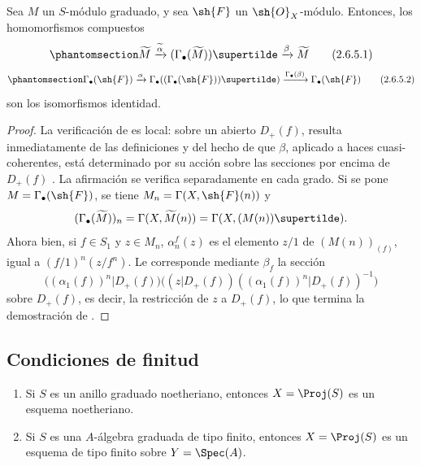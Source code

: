\documentclass[oneside,10pt]{amsart}
\let\EGAOriginalLabel\label
\renewcommand{\label}[1]{\phantomsection\EGAOriginalLabel{#1}}
\begin{document}
\begin{proposition}[2.6.5]
\label{II.2.6.5}
Sea $M$ un $S$-módulo graduado, y sea $\sh{F}$ un $\sh{O}_X$-módulo.
Entonces, los homomorfismos compuestos
\[
\label{II.2.6.5.1}
  \widetilde{M}
  \xrightarrow{\widetilde{\alpha}}(\Gamma_\bullet(\widetilde{M}))\supertilde
  \xrightarrow{\beta}\widetilde{M}
\tag{2.6.5.1}
\]
\[
\label{II.2.6.5.2}
  \Gamma_\bullet(\sh{F})
  \xrightarrow{\alpha}\Gamma_\bullet((\Gamma_\bullet(\sh{F}))\supertilde)
  \xrightarrow{\Gamma_\bullet(\beta)}\Gamma_\bullet(\sh{F})
\tag{2.6.5.2}
\]
son los isomorfismos identidad.
\end{proposition}

\begin{proof}
La verificación de  es local: sobre un abierto $D_+(f)$, resulta inmediatamente de las definiciones y del hecho de que $\beta$, aplicado a haces cuasi-coherentes, está determinado por su acción sobre las secciones por encima de $D_+(f)$ .
La afirmación  se verifica separadamente en cada grado.
Si se pone $M=\Gamma_\bullet(\sh{F})$, se tiene $M_n=\Gamma(X,\sh{F}(n))$ y
\[
  (\Gamma_\bullet(\widetilde{M}))_n
  =\Gamma(X,\widetilde{M}(n))
  =\Gamma(X,(M(n))\supertilde).
\]
Ahora bien, si $f\in S_1$ y $z\in M_n$, $\alpha_n^f(z)$ es el elemento $z/1$ de $(M(n))_{(f)}$, igual a $(f/1)^n(z/f^n)$.
Le corresponde mediante $\beta_f$ la sección
\[
  \Big((\alpha_1(f))^n|D_+(f)\Big)
  \Big((z|D_+(f))((\alpha_1(f))^n|D_+(f))^{-1}\Big)
\]
sobre $D_+(f)$, es decir, la restricción de $z$ a $D_+(f)$, lo que termina la demostración de .
\end{proof}

\subsection{Condiciones de finitud}
\label{subsection:II.2.7}

\begin{proposition}[2.7.1]
\label{II.2.7.1}
\begin{enumerate}
  \item[{\rm(i)}] Si $S$ es un anillo graduado noetheriano, entonces $X=\Proj(S)$ es un esquema noetheriano.
  \item[{\rm(ii)}] Si $S$ es una $A$-álgebra graduada de tipo finito, entonces $X=\Proj(S)$ es un esquema de tipo finito sobre $Y=\Spec(A)$.
\end{enumerate}
\end{proposition}
\end{document}
